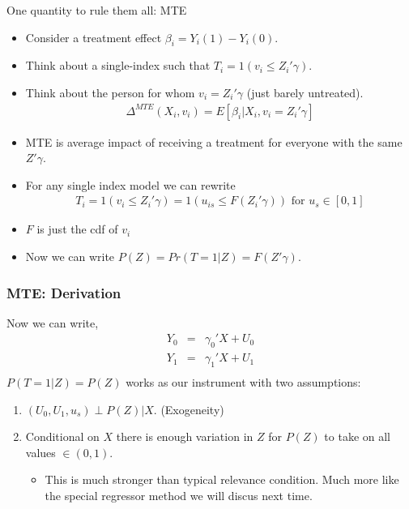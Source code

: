 \begin{frame}{One quantity to rule them all: MTE}
\begin{itemize}
\item Consider a treatment effect $\beta_i = Y_{i}(1) - Y_{i}(0)$.
\item Think about a single-index such that $T_i = 1(v_i \leq Z_i' \gamma)$.
\item Think about the person for whom $v_i = Z_i'\gamma$ (just barely untreated).
\begin{eqnarray*}
\Delta^{MTE}(X_i, v_i) = E[\beta_i | X_i, v_i = Z_i'\gamma] 
\end{eqnarray*}
\item MTE is average impact of receiving a treatment for everyone with the same $Z' \gamma$.
\item For any single index model we can rewrite 
\begin{eqnarray*}
T_i = 1(v_i \leq Z_i' \gamma) = 1(u_{is} \leq F(Z_i' \gamma)) \mbox{ for }  u_s \in [0,1]
\end{eqnarray*}
\item $F$ is just the cdf of $v_i$
\item Now we can write $P(Z) = Pr(T=1|Z )= F(Z'\gamma)$.
\end{itemize}
\end{frame}

\begin{frame}
\frametitle{MTE: Derivation}
Now we can write,
\begin{eqnarray*}
Y_0 &=& \gamma_0' X + U_0\\
Y_1 &=& \gamma_1' X + U_1\\
\end{eqnarray*}
$P(T=1 | Z) = P(Z)$ works as our instrument with two assumptions:
\begin{enumerate}
\item $(U_0, U_1, u_s) \perp P(Z) | X$. (Exogeneity)
\item Conditional on $X$ there is enough variation in $Z$ for $P(Z)$ to take on all values $\in(0,1)$.
\begin{itemize}
\item This is much stronger than typical \alert{relevance} condition. Much more like the \alert{special regressor} method we will discus next time.
\end{itemize}
\end{enumerate}
\end{frame}

